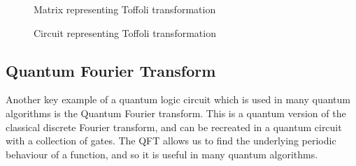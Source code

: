 \begin{figure}[!htb]
\centering
\resizebox{5cm}{!}{}
\caption{Matrix representing Toffoli transformation}
\label{fig:toffolimatrix}
\end{figure}
\begin{figure}[!htb]
\centering
\resizebox{1.5cm}{!}{}
\caption{Circuit representing Toffoli transformation}
\label{fig:toffolicircuit}
\end{figure}
\subsection{Quantum Fourier Transform}
Another key example of a quantum logic circuit which is used in many quantum algorithms is the Quantum Fourier transform. This is a quantum version of the classical discrete Fourier transform, and can be recreated in a quantum circuit with a collection of gates. The QFT allows us to find the underlying periodic behaviour of a function, and so it is useful in many quantum algorithms.
